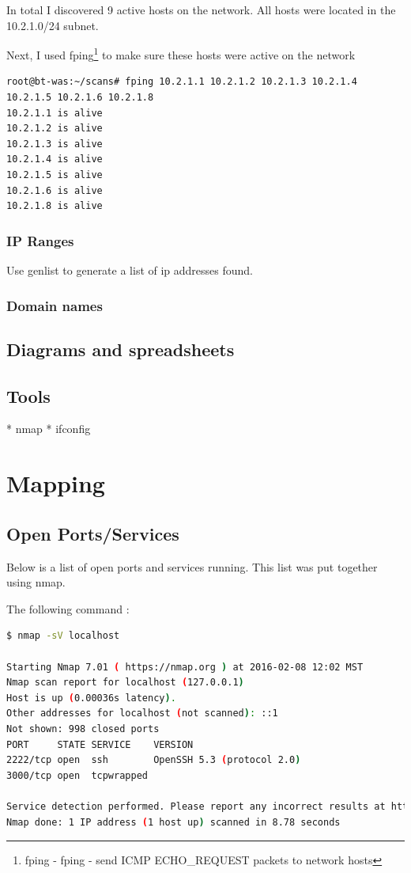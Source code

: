 \documentclass{article}
\begin{document}
In total I discovered 9 active hosts on the network. All hosts were 
located in the 10.2.1.0/24 subnet.

Next, I used fping\footnote{\label{fping}fping - fping - send ICMP ECHO\_REQUEST packets to network hosts} 
to make sure these hosts were active on the network

\begin{lstlisting}
root@bt-was:~/scans# fping 10.2.1.1 10.2.1.2 10.2.1.3 10.2.1.4 10.2.1.5 10.2.1.6 10.2.1.8
10.2.1.1 is alive
10.2.1.2 is alive
10.2.1.3 is alive
10.2.1.4 is alive
10.2.1.5 is alive
10.2.1.6 is alive
10.2.1.8 is alive
\end{lstlisting}


\subsubsection{IP Ranges}

Use genlist to generate a list of ip addresses found.

\subsubsection{Domain names}


\newpage
\subsection{Diagrams and spreadsheets}
\subsection{Tools}

* nmap
* ifconfig

\newpage
\section{Mapping}
\subsection{Open Ports/Services}

Below is a list of open ports and services running. This list was put together using nmap.


\newpage

\noindent The following command :
\begin{lstlisting}[language=bash]
$ nmap -sV localhost

Starting Nmap 7.01 ( https://nmap.org ) at 2016-02-08 12:02 MST
Nmap scan report for localhost (127.0.0.1)
Host is up (0.00036s latency).
Other addresses for localhost (not scanned): ::1
Not shown: 998 closed ports
PORT     STATE SERVICE    VERSION
2222/tcp open  ssh        OpenSSH 5.3 (protocol 2.0)
3000/tcp open  tcpwrapped

Service detection performed. Please report any incorrect results at https://nmap.org/submit/ .
Nmap done: 1 IP address (1 host up) scanned in 8.78 seconds

\end{lstlisting}
\end{document}

